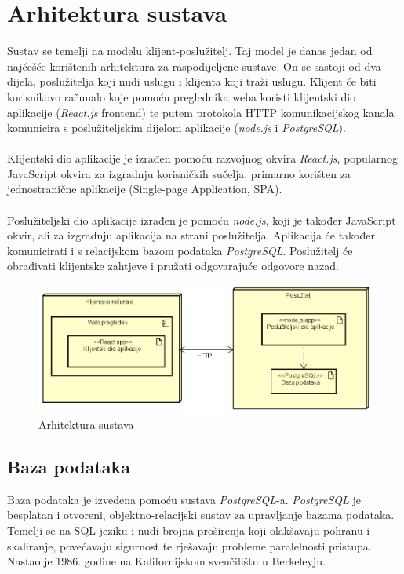 \documentclass[zavrsnirad]{fer}
\begin{document}
\newpage
\chapter{Arhitektura sustava}

Sustav se temelji na modelu klijent-poslužitelj. Taj model je danas jedan od najčešće korištenih arhitektura za raspodijeljene sustave. On se sastoji od dva dijela, poslužitelja koji nudi uslugu i klijenta koji traži uslugu. Klijent će biti korisnikovo računalo koje pomoću preglednika weba koristi klijentski dio aplikacije (\textit{React.js} frontend) te putem protokola HTTP komunikacijskog kanala komunicira s poslužiteljskim dijelom aplikacije (\textit{node.js} i \textit{PostgreSQL}).\\\\
Klijentski dio aplikacije je izrađen pomoću razvojnog okvira \textit{React.js}, popularnog JavaScript okvira za izgradnju korisničkih sučelja, primarno korišten za jednostranične aplikacije (Single-page Application, SPA).\\\\
Poslužiteljski dio aplikacije izrađen je pomoću \textit{node.js}, koji je također JavaScript okvir, ali za izgradnju aplikacija na strani poslužitelja. Aplikacija će također komunicirati i s relacijskom bazom podataka \textit{PostgreSQL}. Poslužitelj će obrađivati klijentske zahtjeve i pružati odgovarajuće odgovore nazad.\\

\begin{figure}[htb]
	\centering
	\includegraphics[width=0.8\linewidth]{Figures/arhitektura.png} 
	\caption{Arhitektura sustava}
	\label{slk:sustav}
\end{figure}
\newpage
\section{Baza podataka}
\label{sec:baza}
Baza podataka je izvedena pomoću sustava \textit{PostgreSQL}-a. \textit{PostgreSQL} je besplatan i otvoreni, objektno-relacijski sustav za upravljanje bazama podataka. Temelji se na SQL jeziku i nudi brojna proširenja koji olakšavaju pohranu i skaliranje, povećavaju sigurnost te rješavaju probleme paralelnosti pristupa. Nastao je 1986. godine na Kalifornijskom sveučilištu u Berkeleyju. \cite{postgresql}\\
\end{document}
